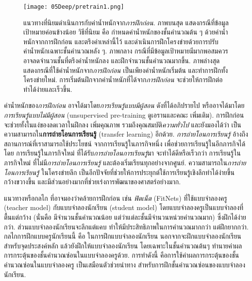 %
\begin{figure}
	\begin{center}
		\texttt{[image: 05Deep/pretrain1.png]}	
		\caption[แนวทางที่นิยมดำเนินการกับค่าน้ำหนักจากการฝึกก่อน]{
			แนวทางที่นิยมดำเนินการกับค่าน้ำหนักจาก\textit{การฝึกก่อน}.
			ภาพบนสุด แสดงกรณีที่ข้อมูลเป้าหมายค่อนข้างน้อย วิธีที่นิยม คือ กำหนดค่าน้ำหนักของชั้นคำนวณต้น ๆ ด้วยค่าน้ำหนักจากการฝึกก่อน และตรึงค่าเหล่านี้ไว้ และดำเนินการฝึกโครงข่ายด้วยการปรับค่าน้ำหนักเฉพาะชั้นคำนวณหลัง ๆ.
		    ภาพกลาง กรณีที่มีข้อมูลเป้าหมายมีมากพอสมควร อาจลดจำนวนชั้นที่ตรึงค่าน้ำหนักลง
		    และฝึกจำนวนชั้นคำนวณมากขึ้น.
		    ภาพล่างสุด แสดงกรณีที่ใช้ค่าน้ำหนักจาก\textit{การฝึกก่อน} เป็นเพียงค่าน้ำหนักเริ่มต้น และทำการฝึกทั้งโครงข่ายใหม่. การเริ่มต้นฝึกจากค่าน้ำหนักที่ได้จาก\textit{การฝึกก่อน} จะช่วยให้การฝึกต่อทำได้ง่ายและเร็วขึ้น.
}
		\label{fig: pre-training}
	\end{center}
\end{figure}
%



ค่าน้ำหนักของ\textit{การฝึกก่อน}
อาจได้มาโดย\textit{การเรียนรู้แบบมีผู้สอน} ดังที่ได้อภิปรายไป
หรืออาจได้มาโดย\textit{การเรียนรู้แบบไม่มีผู้สอน} (unsupervised pre-training 
ดูเอรานและคณะ\cite{ErhanEtAl2010a} เพิ่มเติม).
% 
การฝึกก่อน จะช่วยทั้งในแง่ของลดเวลาในฝึกลง
เพิ่มคุณภาพ รวมถึงคุณสมบัติ\textit{ความทั่วไป}
และยังมองได้ว่า เป็นความสามารถใน\textbf{การถ่ายโอนการเรียนรู้} (transfer learning\cite{zhuang2019comprehensive, LinJung2017, PanYang2010}) อีกด้วย.
\textit{การถ่ายโอนการเรียนรู้} 
อ้างถึง สถานการณ์ที่เราสามารถใช้ประโยชน์
จากการเรียนรู้ในภารกิจหนึ่ง
เพื่อช่วยการเรียนรู้ในอีกภารกิจได้
โดย การเรียนรู้ในภารกิจใหม่
ที่ได้รับ\textit{การถ่ายโอนการเรียนรู้}มา
จะทำได้ดีหรือเร็วกว่า 
การเรียนรู้ในภารกิจใหม่ ที่ไม่มี\textit{การถ่ายโอนการเรียนรู้}
และต้องเริ่มเรียนทุกอย่างจากศูนย์.
ความสามารถใน\textit{การถ่ายโอนการเรียนรู้} ในโครงข่ายลึก
เป็นอีกปัจจัยที่ช่วยให้การประยุกต์ใช้การเรียนรู้เชิงลึกทำได้ง่ายขึ้น กว้างขวางขึ้น และมีส่วนอย่างมากที่ช่วยเร่งการพัฒนาของศาสตร์อย่างมาก.

แนวทางหรือกลไก 
ที่อาจมองว่าคล้ายการฝึกก่อน
เช่น 
\textit{ฟิตเน็ต} (FitNets\cite{RomeroEtAl2015})
ที่ใช้แบบจำลองครู (teacher model) 
กับแบบจำลองนักเรียน (student model)
โดยแบบจำลองครูเป็นแบบจำลองที่ตื้นแต่กว้าง 
(นั่นคือ มีจำนวนชั้นคำนวณน้อย แต่ว่าแต่ละชั้นมีจำนวนหน่วยคำนวณมาก) ซึ่งฝึกได้ง่ายกว่า. 
ส่วนแบบจำลองนักเรียนจะลึกแต่แคบ
ทำให้มีประสิทธิภาพในการคำนวณมากกว่า
แต่ฝึกยากกว่า.
กลไกการฝึกแบบครูนักเรียนนี้
คือ ในการฝึกแบบจำลองนักเรียน
นอกจากจะฝึกแบบจำลองนักเรียนสำหรับจุดประสงค์หลัก
แล้วยังฝึกให้แบบจำลองนักเรียน โดยเฉพาะในชั้นคำนวณต้นๆ ทำนายค่าผลการกระตุ้นของชั้นคำนวณซ่อนในแบบจำลองครูด้วย.
การทำดังนี้ คือการใช้ค่าผลการกระตุ้นของชั้นคำนวณซ่อนในแบบจำลองครู
เป็นเสมือนตัวช่วยนำทาง สำหรับการฝึกชั้นคำนวณซ่อนของแบบจำลองนักเรียน.

